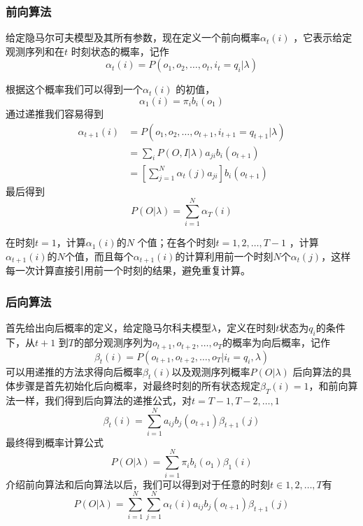 \documentclass[a4paper,12pt]{ctexart}     %
\begin{document}
			\subsubsection{前向算法}
				给定隐马尔可夫模型及其所有参数，现在定义一个前向概率$ \alpha_t(i) $ ，它表示给定观测序列和在$ t $ 时刻状态的概率，记作
				\begin{equation}
					\alpha_t(i) = P(o_1,o_2,\dots,o_t,i_t=q_i| \lambda)
				\end{equation}
			
				根据这个概率我们可以得到一个$ \alpha_t(i) $ 的初值，
				\begin{equation}
					\alpha_1(i) = \pi_ib_i(o_1)
				\end{equation}
				通过递推我们容易得到
				\begin{equation}
					\begin{split}
						\alpha_{t+1}(i) &= P(o_1,o_2,\dots,o_{t+1},i_{t+1}=q_{t+1}| \lambda) \\
						&= \sum_{i}P(O,I|\lambda)a_{ji}b_i(o_{t+1}) \\
						&= [\sum_{j=1}^{N}\alpha_t(j)a_{ji}]b_i(o_{t+1})
					\end{split}
				\end{equation}
				最后得到
				\begin{equation}
					P(O|\lambda) = \sum_{i=1}^{N}\alpha_T(i)
				\end{equation}
			
				在时刻$ t=1 $，计算$ \alpha_1(i) $的$ N $ 个值；在各个时刻$ t=1,2,\dots,T-1 $ ，计算$ \alpha_{t+1}(i) $的$ N $个值，而且每个$ \alpha_{t+1}(i) $的计算利用前一个时刻$ N $个$ \alpha_t(j) $，这样每一次计算直接引用前一个时刻的结果，避免重复计算。
			\subsubsection{后向算法}
				首先给出向后概率的定义，给定隐马尔科夫模型$ \lambda $，定义在时刻$ t $状态为$ q_i $的条件下，从$ t+1 $ 到$ T $的部分观测序列为$ o_{t+1},o_{t+2},\dots,o_T $的概率为向后概率，记作
			\begin{equation}
				\beta_t(i) = P(o_{t+1},o_{t+2},\dots,o_{T}|i_t = q_i,\lambda)
			\end{equation}
		可以用递推的方法求得向后概率$ \beta_t(i) $以及观测序列概率$ P(O|\lambda) $
		后向算法的具体步骤是首先初始化后向概率，对最终时刻的所有状态规定$ \beta_T(i) =1 $，和前向算法一样，我们得到后向算法的递推公式，对$ t = T-1,T-2,\dots,1 $
		\begin{equation}
			\beta_t(i) = \sum_{i=1}^{N}a_{ij}b_j(o_{t+1})\beta_{t+1}(j)
		\end{equation}
		最终得到概率计算公式
		\begin{equation}
			P(O|\lambda) = \sum_{i=1}^{N}\pi_ib_i(o_1)\beta_1(i)
		\end{equation}
		介绍前向算法和后向算法以后，我们可以得到对于任意的时刻$ t \in {1,2,\dots,T} $有
		\begin{equation}
			P(O|\lambda) = \sum_{i=1}^{N}\sum_{j=1}^{N}\alpha_t(i)a_{ij}b_j(o_{t+1})\beta_{t+1}(j)
		\end{equation}
\end{document}
